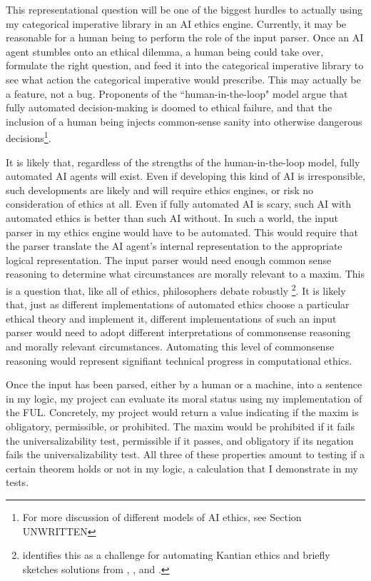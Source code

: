 \begin{isabellebody}
\begin{isamarkuptext}
This representational
question will be one of the biggest hurdles to actually using my categorical imperative library 
in an AI ethics engine. Currently, it may be reasonable for a human being to perform the role of the input
parser. Once an AI agent stumbles onto an ethical dilemma, a human being could take over, formulate 
the right question, and feed it into the categorical imperative library to see what action the categorical 
imperative would prescribe. This may actually be a feature, not a bug. 
Proponents of the ``human-in-the-loop" model argue that fully automated decision-making is doomed 
to ethical failure, and that the inclusion of a human being injects common-sense sanity into otherwise 
dangerous decisions\footnote{For more discussion of different models of AI ethics, see Section UNWRITTEN}.  

It is likely that, regardless of the strengths of the human-in-the-loop model, fully automated AI 
agents will exist. Even if developing this kind of AI is irresponsible,
such developments are likely and will require ethics engines, or risk no consideration of ethics at all. Even if 
fully automated AI is scary, such AI with automated ethics is better than such AI without. 
In such a world, the input parser in my ethics engine would have to be automated. This would require 
that the parser translate the AI agent's internal representation to the appropriate logical representation.
The input parser would need enough common sense reasoning to determine what circumstances are morally 
relevant to a maxim. This is a question that, like all of ethics, philosophers debate robustly
\footnote{\citet{powers} identifies this as a challenge for automating Kantian ethics and briefly sketches 
solutions from \citet{constofreason}, \citet{silber}, and \citet{rawlsconstructivism}. }. 
It is likely that, just as different implementations of automated ethics choose 
a particular ethical theory and implement it, different implementations of such an input parser would 
need to adopt different interpretations of commonsense reasoning and morally relevant circumstances.
Automating this level of commonsense reasoning would represent signifiant technical progress in 
computational ethics.

Once the input has been parsed, either by a human or a machine, into  a sentence in my logic, my 
project can evaluate its moral status using my implementation of 
the FUL. Concretely, my project would return a value indicating if the maxim is obligatory, permissible, 
or prohibited. The maxim would be prohibited if it fails the universalizability test, permissible if it passes, and obligatory 
if its negation fails the universalizability test. All three of these properties amount to testing if a 
certain theorem holds or not in my logic, a calculation that I demonstrate in my tests. 


\end{isamarkuptext}
\end{isabellebody}
